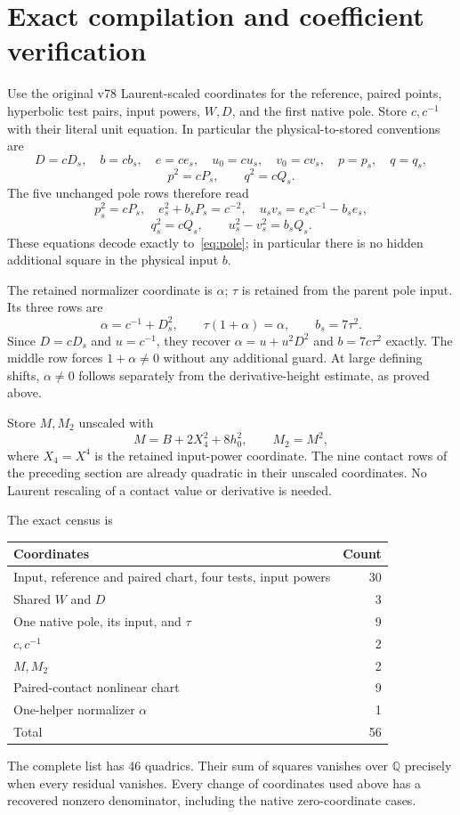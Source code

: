 \documentclass[11pt,a4paper]{article}
\newcommand{\Q}{\mathbb Q}\newcommand{\Z}{\mathbb Z}
\begin{document}
\section{Exact compilation and coefficient verification}

Use the original v78 Laurent-scaled coordinates for the reference,
paired points, hyperbolic test pairs, input powers, $W,D$, and the first
native pole. Store $c,c^{-1}$ with their literal unit equation.
In particular the physical-to-stored conventions are
\[
 D=cD_s,\quad b=cb_s,\quad e=ce_s,\quad
 u_0=cu_s,\quad v_0=cv_s,\quad p=p_s,\quad q=q_s,
\]
\[
 p^2=cP_s,\qquad q^2=cQ_s.
\]
The five unchanged pole rows therefore read
\[
 p_s^2=cP_s,\quad e_s^2+b_sP_s=c^{-2},\quad
 u_sv_s=e_sc^{-1}-b_se_s,
\]
\[
 q_s^2=cQ_s,\qquad u_s^2-v_s^2=b_sQ_s.
\]
These equations decode exactly to~\eqref{eq:pole}; in particular
there is no hidden additional square in the physical input $b$.

The retained normalizer coordinate is $\alpha$; $\tau$ is retained
from the parent pole input. Its three rows are
\begin{equation}\label{eq:quadratic-gate}
 \alpha=c^{-1}+D_s^2,\qquad
 \tau(1+\alpha)=\alpha,\qquad b_s=7\tau^2.
\end{equation}
Since $D=cD_s$ and $u=c^{-1}$, they recover
$\alpha=u+u^2D^2$ and $b=7c\tau^2$ exactly.
The middle row forces $1+\alpha\ne0$ without any additional guard.
At large defining shifts, $\alpha\ne0$ follows separately from the
derivative-height estimate, as proved above.

Store $M,M_2$ unscaled with
\[
 M=B+2X_4^2+8h_0^2,\qquad M_2=M^2,
\]
where $X_4=X^4$ is the retained input-power coordinate. The nine contact
rows of the preceding section are already quadratic in their unscaled
coordinates. No Laurent rescaling of a contact value or derivative is
needed.

\begin{samepage}
The exact census is
\begin{center}
\begin{tabular}{lr}
\toprule
Coordinates&Count\\\midrule
Input, reference and paired chart, four tests, input powers&30\\
Shared $W$ and $D$&3\\
One native pole, its input, and $\tau$&9\\
$c,c^{-1}$&2\\
$M,M_2$&2\\
Paired-contact nonlinear chart&9\\
One-helper normalizer $\alpha$&1\\\midrule
Total&56\\\bottomrule
\end{tabular}
\end{center}
\end{samepage}
The complete list has 46 quadrics. Their sum of squares vanishes over
$\Q$ precisely when every residual vanishes. Every change of coordinates
used above has a recovered nonzero denominator, including the native
zero-coordinate cases.
\end{document}
